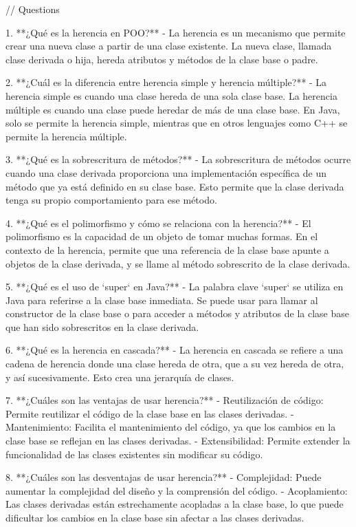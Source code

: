 // Questions


1. **¿Qué es la herencia en POO?**
   - La herencia es un mecanismo que permite crear una nueva clase a partir de una clase existente. La nueva clase, llamada clase derivada o hija, hereda atributos y métodos de la clase base o padre.

2. **¿Cuál es la diferencia entre herencia simple y herencia múltiple?**
   - La herencia simple es cuando una clase hereda de una sola clase base. La herencia múltiple es cuando una clase puede heredar de más de una clase base. En Java, solo se permite la herencia simple, mientras que en otros lenguajes como C++ se permite la herencia múltiple.

3. **¿Qué es la sobrescritura de métodos?**
   - La sobrescritura de métodos ocurre cuando una clase derivada proporciona una implementación específica de un método que ya está definido en su clase base. Esto permite que la clase derivada tenga su propio comportamiento para ese método.

4. **¿Qué es el polimorfismo y cómo se relaciona con la herencia?**
   - El polimorfismo es la capacidad de un objeto de tomar muchas formas. En el contexto de la herencia, permite que una referencia de la clase base apunte a objetos de la clase derivada, y se llame al método sobrescrito de la clase derivada.

5. **¿Qué es el uso de `super` en Java?**
   - La palabra clave `super` se utiliza en Java para referirse a la clase base inmediata. Se puede usar para llamar al constructor de la clase base o para acceder a métodos y atributos de la clase base que han sido sobrescritos en la clase derivada.

6. **¿Qué es la herencia en cascada?**
   - La herencia en cascada se refiere a una cadena de herencia donde una clase hereda de otra, que a su vez hereda de otra, y así sucesivamente. Esto crea una jerarquía de clases.

7. **¿Cuáles son las ventajas de usar herencia?**
   - Reutilización de código: Permite reutilizar el código de la clase base en las clases derivadas.
   - Mantenimiento: Facilita el mantenimiento del código, ya que los cambios en la clase base se reflejan en las clases derivadas.
   - Extensibilidad: Permite extender la funcionalidad de las clases existentes sin modificar su código.

8. **¿Cuáles son las desventajas de usar herencia?**
   - Complejidad: Puede aumentar la complejidad del diseño y la comprensión del código.
   - Acoplamiento: Las clases derivadas están estrechamente acopladas a la clase base, lo que puede dificultar los cambios en la clase base sin afectar a las clases derivadas.
